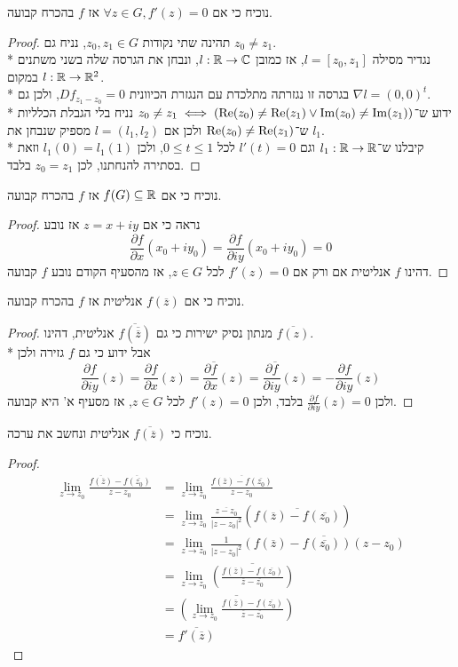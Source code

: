 \Subquestion{}
נוכיח כי אם $\forall z \in G, f'(z) = 0$ אז $f$ בהכרח קבועה.
\begin{proof}
	תהינה שתי נקודות $z_0, z_1 \in G$, נניח גם $z_0 \ne z_1$. \\*
	נגדיר מסילה $l = [z_0, z_1]$, אז כמובן $l : \mathbb{R} \to \mathbb{C}$, ונבחן את הגרסה שלה בשני משתנים $l : \mathbb{R} \to \mathbb{R}^2$ במקום. \\*
	בגרסה זו נגזרתה מתלכדת עם הנגזרת הכיוונית $Df_{z_1 - z_0} = 0$, ולכן גם $\nabla l = {(0, 0)}^t$. \\*
	ידוע ש־$z_0 \ne z_1 \iff (\operatorname{Re}(z_0) \ne \operatorname{Re}(z_1) \lor \operatorname{Im}(z_0) \ne \operatorname{Im}(z_1))$ נניח בלי הגבלת הכלליות ש־$\operatorname{Re}(z_0) \ne \operatorname{Re}(z_1)$ ולכן אם $l = (l_1, l_2)$ מספיק שנבחן את $l_1$. \\*
	קיבלנו ש־$l_1 : \mathbb{R} \to \mathbb{R}$ וגם $l'(t) = 0$ לכל $0 \le t \le 1$, ולכן $l_1(0) = l_1(1)$ וזאת בסתירה להנחתנו, לכן $z_0 = z_1$ בלבד.
\end{proof}

\Subquestion{}
נוכיח כי אם $f(G) \subseteq \mathbb{R}$ אז $f$ בהכרח קבועה.
\begin{proof}
	נראה כי אם $z = x + iy$ אז נובע
	\[
		\frac{\partial f}{\partial x} (x_0 + iy_0) = \frac{\partial f}{\partial iy} (x_0 + iy_0) = 0
	\]
	דהינו $f$ אנליטית אם ורק אם $f'(z) = 0$ לכל $z \in G$, אז מהסעיף הקודם נובע $f$ קבועה.
\end{proof}

\Subquestion{}
נוכיח כי אם $f(\overline{z})$ אנליטית אז $f$ בהכרח קבועה.
\begin{proof}
	מנתון נסיק ישירות כי גם $\overline{f(\overline{\overline{z}})}$ אנליטית, דהינו $\overline{f(z)}$. \\*
	אבל ידוע כי גם $f$ גזירה ולכן
	\[
		\frac{\partial f}{\partial iy}(z)
		= \frac{\partial f}{\partial x}(z)
		= \frac{\partial \overline{f}}{\partial x}(z)
		= \frac{\partial \overline{f}}{\partial iy}(z)
		= -\frac{\partial f}{\partial iy}(z)
	\]
	ולכן $\frac{\partial f}{\partial iy}(z) = 0$ בלבד, ולכן $f'(z) = 0$ לכל $z \in G$, אז מסעיף א' היא קבועה.
\end{proof}

\Subquestion{}
נוכיח כי $\overline{f(\overline{z})}$ אנליטית ונחשב את ערכה.
\begin{proof}
	\begin{align*}
		\lim_{z \to z_0} \frac{\overline{f(\overline{z})} - \overline{f(\overline{z_0})}}{z - z_0}
		& = \lim_{z \to z_0} \frac{\overline{f(\overline{z}) - f(\overline{z_0})}}{z - z_0} \\
		& = \lim_{z \to z_0} \frac{\overline{z - z_0}}{{|z - z_0|}^2} (\overline{f(\overline{z}) - f(\overline{z_0})}) \\
		& = \lim_{z \to z_0} \frac{1}{{|z - z_0|}^2} \overline{(f(\overline{z}) - f(\overline{z_0})) (z - z_0)} \\
		& = \lim_{z \to z_0} \overline{\left(\frac{f(\overline{z}) - f(\overline{z_0})}{\overline{z} - \overline{z_0}}\right)} \\
		& = \overline{\left(\lim_{z \to z_0} \frac{f(\overline{z}) - f(\overline{z_0})}{\overline{z} - \overline{z_0}}\right)} \\
		& = \overline{f'(\overline{z})}
	\end{align*}
\end{proof}

